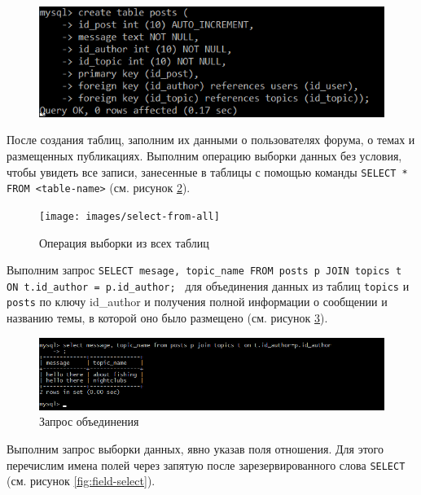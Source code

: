 \documentclass[a4paper,14pt]{extarticle}
\begin{document}
\begin{figure}[h!]
	\centering
	\includegraphics[width=0.6\linewidth]{images/create-posts}
	\caption{}
	\label{fig:create-posts}
\end{figure}

После создания таблиц, заполним их данными о пользователях форума, о темах и размещенных публикациях. Выполним операцию выборки данных без условия, чтобы увидеть все записи, занесенные в таблицы с помощью команды \texttt{SELECT * FROM <table-name>} (см. рисунок \ref{fig:select-from-all}). 

\begin{figure}[h!]
	\centering
	\texttt{[image: images/select-from-all]}
	\caption{Операция выборки из всех таблиц }
	\label{fig:select-from-all}
\end{figure}

Выполним запрос \texttt{SELECT mesage, topic\_name FROM posts p JOIN topics t ON t.id\_author = p.id\_author; } для объединения данных из таблиц \texttt{topics} и \texttt{posts} по ключу id\_author и получения полной информации о сообщении и названию темы, в которой оно было размещено (см. рисунок \ref{fig:join-post-author}).
	
	\begin{figure}
		\centering
		\includegraphics[width=0.8\linewidth]{images/join-post-author}
		\caption{Запрос объединения}
		\label{fig:join-post-author}
	\end{figure}

Выполним запрос выборки данных, явно указав поля отношения. Для этого перечислим имена полей через запятую после зарезервированного слова \texttt{SELECT} (см. рисунок \ref{fig:field-select}).
\end{document}
